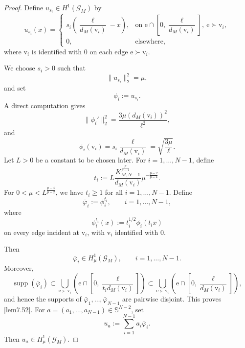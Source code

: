 \documentclass[11pt]{amsart}
\newcommand{\G}{\mathcal{G}}
\newcommand{\e}{\mathrm{e}}
\newcommand{\vv}{\mathrm{v}}
\numberwithin{equation}{section}
\begin{document}
\begin{proof}
Define $u_{s_i}\in H^1(\G_M)$ by
$$
u_{s_i}(x)=
\begin{cases}
s_i\left(\dfrac{\ell}{d_M(\vv_i)}-x\right),
&\text{on } \e\cap\left[0,\dfrac{\ell}{d_M(\vv_i)}\right],\ \e\succ\vv_i,\\
0,
&\text{elsewhere},
\end{cases}
$$
where $\vv_i$ is identified with $0$ on each edge $\e\succ\vv_i$.

We choose $s_i>0$ such that
$$
\|u_{s_i}\|_2^2=\mu,
$$
and set
$$
\phi_i:=u_{s_i}.
$$
A direct computation gives
$$
\|\phi_i'\|_2^2
=
\frac{3\mu \left(d_M(\vv_i)\right)^2}{\ell^2},
$$
and
$$
\phi_i(\vv_i)
=
s_i\frac{\ell}{d_M(\vv_i)}
=
\sqrt{\frac{3\mu}{\ell}}.
$$
Let $L>0$ be a constant to be chosen later. For $i=1,\ldots,N-1$, define
$$
t_i
:=
L\frac{K^{\frac{p}{p-4}}_{M,N-1}}{d_M(\vv_i)}
\mu^{-\frac{p-2}{p-4}}.
$$
For $0<\mu<L^\frac{p-4}{p-2}$, we have
$t_i\geq1$ for all $i=1,\ldots,N-1$.
Define
$$
\bar{\varphi}_i:=\phi_i^{t_i},
\qquad i=1,\ldots,N-1,
$$
where
$$
\phi_i^{t_i}(x):=t_i^{1/2}\phi_i(t_ix)
$$
on every edge incident at $\vv_i$, with $\vv_i$ identified with $0$.

Then
$$
\bar{\varphi}_i\in H^1_\mu(\G_M),
\qquad i=1,\ldots,N-1.
$$
Moreover,
$$
\operatorname{supp}(\bar{\varphi}_i)
\subset
\bigcup_{\e\succ\vv_i}
\left(
\e\cap\left[0,\frac{\ell}{t_id_M(\vv_i)}\right]
\right)
\subset
\bigcup_{\e\succ\vv_i}
\left(
\e\cap\left[0,\frac{\ell}{d_M(\vv_i)}\right]
\right),
$$
and hence the supports of
$\bar{\varphi}_1,\ldots,\bar{\varphi}_{N-1}$ are pairwise disjoint. This proves \ref{lem7.52}.
For $a=(a_1,\ldots,a_{N-1})\in\mathbb S^{N-2}$, set
$$
u_a:=\sum_{i=1}^{N-1}a_i\bar{\varphi}_i.
$$
Then $u_a\in H^1_\mu(\G_M)$.


\end{proof}
\end{document}
